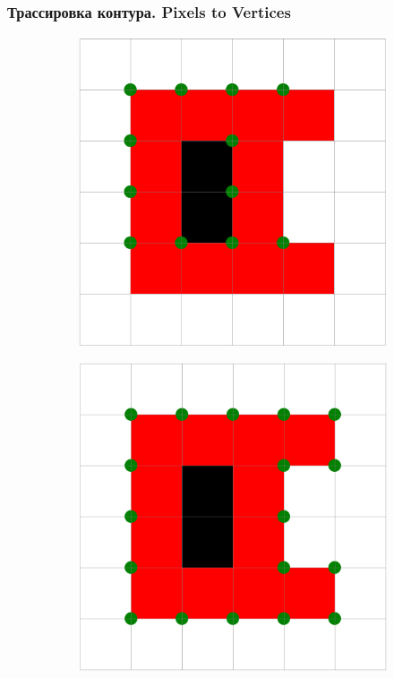 \documentclass[10pt, unicode]{beamer}
\begin{document}
    \begin{frame}
        \frametitle{Трассировка контура. Pixels to Vertices}
        \begin{figure}[H]
            \centering
            \begin{subfigure}[l]{0.50\linewidth}
                \centering
                \includegraphics[scale=0.25]{SuzukiExample2_uvs.png}
            \end{subfigure}
            \begin{subfigure}{0.49\linewidth}
                \centering
                \includegraphics[scale=0.25]{SuzukiExample2_wanted_uvs.png}
            \end{subfigure}
        \end{figure}
    \end{frame}
\end{document}
